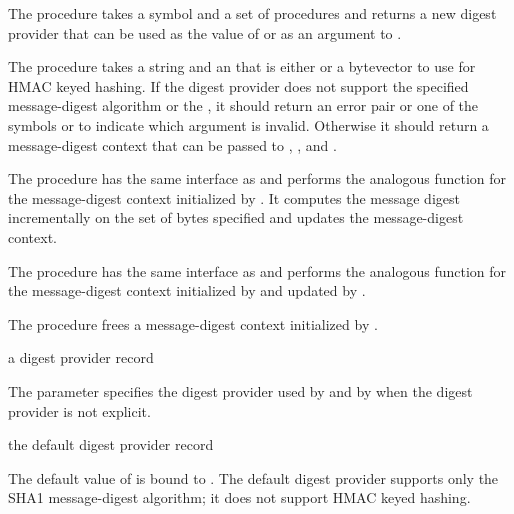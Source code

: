 The  procedure takes a symbol 
and a set of procedures and returns a new digest provider that can
be used as the value of  or as an
argument to .

The  procedure takes a string  and an 
that is either  or a bytevector to use for HMAC keyed hashing.
If the digest provider does not support the specified message-digest algorithm
 or the , it should return an error pair or one of
the symbols  or  to indicate which argument
is invalid.
Otherwise it should return a message-digest context that can be
passed to , , and .

The  procedure has the same interface as  and
performs the analogous function for the message-digest context initialized by
. It computes the message digest incrementally on the set of bytes
specified and updates the message-digest context.

The  procedure has the same interface as  and
performs the analogous function for the message-digest context initialized by
 and updated by .

The  procedure frees a message-digest context initialized
by .

\begin{parameter}
\end{parameter}
\returns{} a digest provider record

The  parameter specifies the digest provider
used by  and by  when the
digest provider is not explicit.

\begin{binding}
\end{binding}
\returns{} the default digest provider record

The default value of  is bound to
.
The default digest provider supports only the SHA1 message-digest algorithm;
it does not support HMAC keyed hashing.

